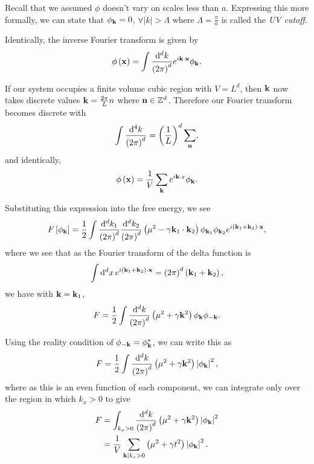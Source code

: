 Recall that we assumed $\phi$ doesn't vary on scales less than $a$. Expressing this more formally, we can state that $\phi_{\vb{k}} = 0$, $\forall  \left| k \right| > \Lambda$ where $\Lambda = \frac{\pi}{a}$ is called the \textit{UV cutoff}.

Identically, the inverse Fourier transform is given by
\begin{align}
    \phi \left( \vb{x} \right) = \int \frac{\dd{^{d}k}}{\left( 2\pi \right)^{d}} e^{i \vb{k} \cdot \vb{x}} \phi_{\vb{k}}
.\end{align}

If our system occupies a finite volume cubic region with $V = L^{d}$, then $\vb{k}$ now takes discrete values $\vb{k} = \frac{2\pi}{L} n$ where $\vb{n} \in \mathbb{Z}^{d}$. Therefore our Fourier transform becomes discrete with
\begin{align}
    \int \frac{\dd{^{4}k}}{\left( 2\pi \right)^{d}} = \left( \frac{1}{L} \right)^{d} \sum_{\vb{n}} 
,\end{align}
and identically,
\begin{align}
    \phi \left( \vb{x} \right) = \frac{1}{V} \sum_{\vb{k}}^{} e^{i \vb{k} \cdot x} \phi_{\vb{k}} 
.\end{align}

Substituting this expression into the free energy, we see
\begin{align}
    F \left[ \phi_{\vb{k}} \right] = \frac{1}{2} \int \frac{\dd{^{d}k_1}}{\left( 2\pi \right)^{d}} \frac{\dd{^{d}k_2}}{\left( 2\pi \right)^{d}} \left( \mu^2 - \gamma \vb{k}_1 \cdot \vb{k}_2 \right) \phi_{\vb{k}_1} \phi_{\vb{k}_2} e^{i \left( \vb{k}_1 + \vb{k}_2 \right) \cdot \vb{x}}
,\end{align}
where we see that as the Fourier transform of the delta function is
\begin{align}
    \int \dd{^{d}x} e^{i \left( \vb{k}_1 + \vb{k}_2 \right) \cdot \vb{x}} = \left( 2\pi \right)^{d} \left( \vb{k}_1 + \vb{k}_2 \right) 
,\end{align}
we have with $\vb{k} = \vb{k}_1$,
\begin{align}
    F = \frac{1}{2} \int \frac{\dd{^{d}k}}{\left( 2\pi \right)^{d}} \left( \mu^2 + \gamma \vb{k}^2 \right) \phi_{\vb{k}} \phi_{-\vb{k}}
.\end{align}

Using the reality condition of $\phi_{-\vb{k}} = \phi_{\vb{k}}^{*}$, we can write this as
\begin{align}
    F = \frac{1}{2} \int \frac{\dd{^{d}k}}{\left( 2\pi \right)^{d}} \left( \mu^2 + \gamma \vb{k}^2 \right) \left| \phi_{\vb{k}} \right|^2 
,\end{align}
where as this is an even function of each component, we can integrate only over the region in which $k_x > 0$ to give
\begin{align}
    F &= \int_{k_x > 0} \frac{\dd{^{d}k}}{\left( 2\pi \right)^{d}} \left( \mu^2 + \gamma \vb{k}^2 \right) \left| \phi_{\vb{k}} \right|^2 \\
      &= \frac{1}{V} \sum_{\vb{k} | k_x > 0}^{}  \left( \mu^2 + \gamma t^2 \right)  \left| \phi_{\vb{k}} \right|^2
.\end{align}

